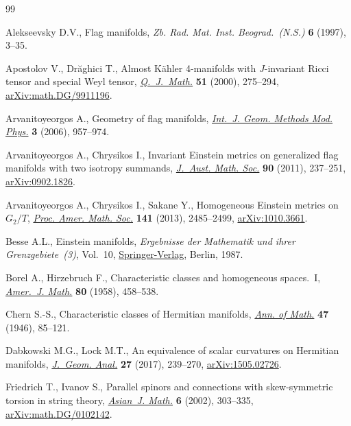 \begin{thebibliography}{99}
\footnotesize\itemsep=0pt

Alekseevsky D.V., Flag manifolds, \textit{Zb. Rad. Mat. Inst. Beograd.~(N.S.)}
 \textbf{6} (1997), 3--35.

Apostolov V., Dr\u{a}ghici T., Almost {K}\"ahler 4-manifolds with
 {$J$}-invariant {R}icci tensor and special {W}eyl tensor,
 \href{https://doi.org/10.1093/qjmath/51.3.275}{\textit{Q.~J.~Math.}} \textbf{51} (2000), 275--294, \href{https://arxiv.org/abs/math.DG/9911196}{arXiv:math.DG/9911196}.

Arvanitoyeorgos A., Geometry of flag manifolds, \href{https://doi.org/10.1142/S0219887806001399}{\textit{Int.~J. Geom. Methods
 Mod. Phys.}} \textbf{3} (2006), 957--974.

Arvanitoyeorgos A., Chrysikos I., Invariant {E}instein metrics on generalized
 flag manifolds with two isotropy summands, \href{https://doi.org/10.1017/S1446788711001303}{\textit{J.~Aust. Math. Soc.}}
 \textbf{90} (2011), 237--251, \href{https://arxiv.org/abs/0902.1826}{arXiv:0902.1826}.

Arvanitoyeorgos A., Chrysikos I., Sakane Y., Homogeneous {E}instein metrics on
 {$G_2/T$}, \href{https://doi.org/10.1090/S0002-9939-2013-11682-5}{\textit{Proc. Amer. Math. Soc.}} \textbf{141} (2013), 2485--2499,
 \href{https://arxiv.org/abs/1010.3661}{arXiv:1010.3661}.

Besse A.L., Einstein manifolds, \textit{Ergebnisse der Mathematik und ihrer
 Grenzgebiete~(3)}, Vol.~10, \href{https://doi.org/10.1007/978-3-540-74311-8}{Springer-Verlag}, Berlin, 1987.

Borel A., Hirzebruch F., Characteristic classes and homogeneous spaces.~{I},
 \href{https://doi.org/10.2307/2372795}{\textit{Amer.~J. Math.}} \textbf{80} (1958), 458--538.

Chern S.-S., Characteristic classes of {H}ermitian manifolds, \href{https://doi.org/10.2307/1969037}{\textit{Ann. of
 Math.}} \textbf{47} (1946), 85--121.

Dabkowski M.G., Lock M.T., An equivalence of scalar curvatures on {H}ermitian
 manifolds, \href{https://doi.org/10.1007/s12220-016-9680-4}{\textit{J.~Geom. Anal.}} \textbf{27} (2017), 239--270,
 \href{https://arxiv.org/abs/1505.02726}{arXiv:1505.02726}.

Friedrich T., Ivanov S., Parallel spinors and connections with skew-symmetric
 torsion in string theory, \href{https://doi.org/10.4310/AJM.2002.v6.n2.a5}{\textit{Asian~J. Math.}} \textbf{6} (2002),
 303--335, \href{https://arxiv.org/abs/math.DG/0102142}{arXiv:math.DG/0102142}.


\end{thebibliography}
